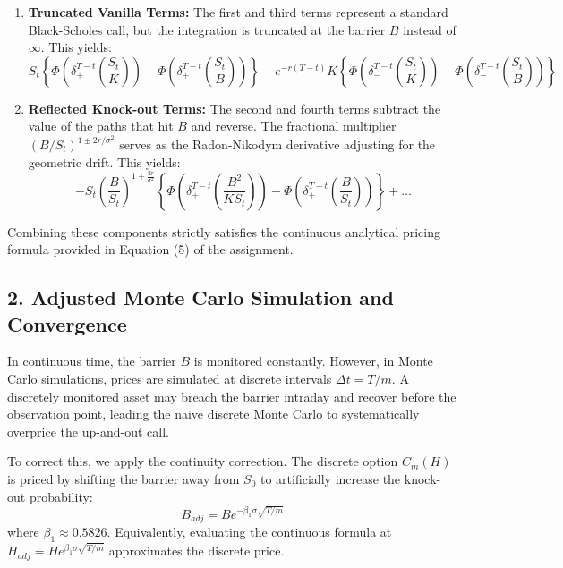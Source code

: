 \begin{enumerate}
    \item \textbf{Truncated Vanilla Terms:} The first and third terms represent a standard Black-Scholes call, but the integration is truncated at the barrier $B$ instead of $\infty$. This yields:
    \begin{equation*}
        S_t \left\{ \Phi\left(\delta_+^{T-t}\left(\frac{S_t}{K}\right)\right) - \Phi\left(\delta_+^{T-t}\left(\frac{S_t}{B}\right)\right) \right\} - e^{-r(T-t)}K \left\{ \Phi\left(\delta_-^{T-t}\left(\frac{S_t}{K}\right)\right) - \Phi\left(\delta_-^{T-t}\left(\frac{S_t}{B}\right)\right) \right\}
    \end{equation*}
    
    \item \textbf{Reflected Knock-out Terms:} The second and fourth terms subtract the value of the paths that hit $B$ and reverse. The fractional multiplier $(B/S_t)^{1 \pm 2r/\sigma^2}$ serves as the Radon-Nikodym derivative adjusting for the geometric drift. This yields:
    \begin{equation*}
        - S_t \left(\frac{B}{S_t}\right)^{1+\frac{2r}{\sigma^2}} \left\{ \Phi\left(\delta_+^{T-t}\left(\frac{B^2}{KS_t}\right)\right) - \Phi\left(\delta_+^{T-t}\left(\frac{B}{S_t}\right)\right) \right\} + \dots
    \end{equation*}
\end{enumerate}
Combining these components strictly satisfies the continuous analytical pricing formula provided in Equation (5) of the assignment.

\subsection*{2. Adjusted Monte Carlo Simulation and Convergence}

In continuous time, the barrier $B$ is monitored constantly. However, in Monte Carlo simulations, prices are simulated at discrete intervals $\Delta t = T/m$. A discretely monitored asset may breach the barrier intraday and recover before the observation point, leading the naive discrete Monte Carlo to systematically overprice the up-and-out call.

To correct this, we apply the continuity correction. The discrete option $C_m(H)$ is priced by shifting the barrier away from $S_0$ to artificially increase the knock-out probability:
\begin{equation}
    B_{adj} = B e^{-\beta_1 \sigma \sqrt{T/m}}
\end{equation}
where $\beta_1 \approx 0.5826$. Equivalently, evaluating the continuous formula at $H_{adj} = H e^{\beta_1 \sigma \sqrt{T/m}}$ approximates the discrete price.

